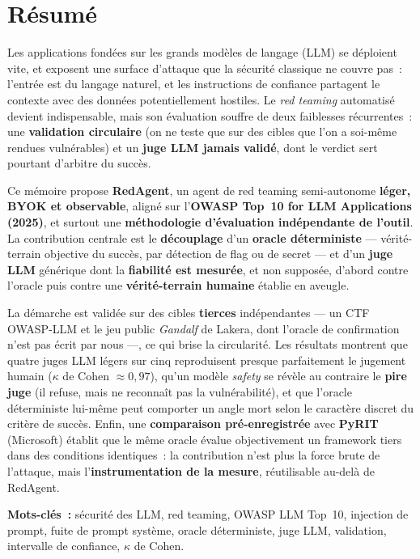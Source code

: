 \chapter*{Résumé}
\thispagestyle{plain}

Les applications fondées sur les grands modèles de langage (LLM) se déploient vite, et exposent une surface d'attaque que la sécurité classique ne couvre pas~: l'entrée est du langage naturel, et les instructions de confiance partagent le contexte avec des données potentiellement hostiles. Le \emph{red teaming} automatisé devient indispensable, mais son évaluation souffre de deux faiblesses récurrentes~: une \textbf{validation circulaire} (on ne teste que sur des cibles que l'on a soi-même rendues vulnérables) et un \textbf{juge LLM jamais validé}, dont le verdict sert pourtant d'arbitre du succès.

Ce mémoire propose \textbf{RedAgent}, un agent de red teaming semi-autonome \textbf{léger, BYOK et observable}, aligné sur l'\textbf{OWASP Top~10 for LLM Applications (2025)}, et surtout une \textbf{méthodologie d'évaluation indépendante de l'outil}. La contribution centrale est le \textbf{découplage} d'un \textbf{oracle déterministe} — vérité-terrain objective du succès, par détection de flag ou de secret — et d'un \textbf{juge LLM} générique dont la \textbf{fiabilité est mesurée}, et non supposée, d'abord contre l'oracle puis contre une \textbf{vérité-terrain humaine} établie en aveugle.

La démarche est validée sur des cibles \textbf{tierces} indépendantes — un CTF OWASP-LLM et le jeu public \emph{Gandalf} de Lakera, dont l'oracle de confirmation n'est pas écrit par nous —, ce qui brise la circularité. Les résultats montrent que quatre juges LLM légers sur cinq reproduisent presque parfaitement le jugement humain ($\kappa$ de Cohen $\approx 0{,}97$), qu'un modèle \emph{safety} se révèle au contraire le \textbf{pire juge} (il refuse, mais ne reconnaît pas la vulnérabilité), et que l'oracle déterministe lui-même peut comporter un angle mort selon le caractère discret du critère de succès. Enfin, une \textbf{comparaison pré-enregistrée} avec \textbf{PyRIT} (Microsoft) établit que le même oracle évalue objectivement un framework tiers dans des conditions identiques~: la contribution n'est plus la force brute de l'attaque, mais l'\textbf{instrumentation de la mesure}, réutilisable au-delà de RedAgent.

\vspace{0.4cm}
\noindent\textbf{Mots-clés~:} sécurité des LLM, red teaming, OWASP LLM Top~10, injection de prompt, fuite de prompt système, oracle déterministe, juge LLM, validation, intervalle de confiance, $\kappa$ de Cohen.
